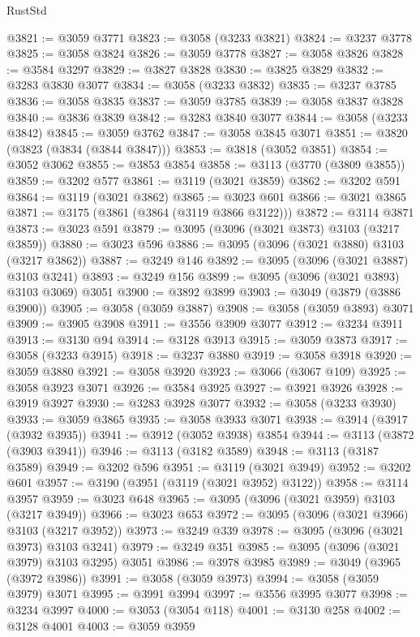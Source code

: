 \begin{lexlean}{RustStd}
\begin{coremodule}
{\begin{coremodule}
{{{{{{{{{{{{{{{{{{{{{{{{{{{{{{{{@3821 := @3059 @3771
@3823 := @3058 (@3233 @3821)
@3824 := @3237 @3778
@3825 := @3058 @3824
@3826 := @3059 @3778
@3827 := @3058 @3826
@3828 := @3584 @3297
@3829 := @3827 @3828
@3830 := @3825 @3829
@3832 := @3283 @3830 @3077
@3834 := @3058 (@3233 @3832)
@3835 := @3237 @3785
@3836 := @3058 @3835
@3837 := @3059 @3785
@3839 := @3058 @3837 @3828
@3840 := @3836 @3839
@3842 := @3283 @3840 @3077
@3844 := @3058 (@3233 @3842)
@3845 := @3059 @3762
@3847 := @3058 @3845 @3071
@3851 := @3820 (@3823 (@3834 (@3844 @3847)))
@3853 := @3818 (@3052 @3851)
@3854 := @3052 @3062
@3855 := @3853 @3854
@3858 := @3113 (@3770 (@3809 @3855))
@3859 := @3202 @577
@3861 := @3119 (@3021 @3859)
@3862 := @3202 @591
@3864 := @3119 (@3021 @3862)
@3865 := @3023 @601
@3866 := @3021 @3865
@3871 := @3175 (@3861 (@3864 (@3119 @3866 @3122)))
@3872 := @3114 @3871
@3873 := @3023 @591
@3879 := @3095 (@3096 (@3021 @3873) @3103 (@3217 @3859))
@3880 := @3023 @596
@3886 := @3095 (@3096 (@3021 @3880) @3103 (@3217 @3862))
@3887 := @3249 @146
@3892 := @3095 (@3096 (@3021 @3887) @3103 @3241)
@3893 := @3249 @156
@3899 := @3095 (@3096 (@3021 @3893) @3103 @3069) @3051
@3900 := @3892 @3899
@3903 := @3049 (@3879 (@3886 @3900))
@3905 := @3058 (@3059 @3887)
@3908 := @3058 (@3059 @3893) @3071
@3909 := @3905 @3908
@3911 := @3556 @3909 @3077
@3912 := @3234 @3911
@3913 := @3130 @94
@3914 := @3128 @3913
@3915 := @3059 @3873
@3917 := @3058 (@3233 @3915)
@3918 := @3237 @3880
@3919 := @3058 @3918
@3920 := @3059 @3880
@3921 := @3058 @3920
@3923 := @3066 (@3067 @109)
@3925 := @3058 @3923 @3071
@3926 := @3584 @3925
@3927 := @3921 @3926
@3928 := @3919 @3927
@3930 := @3283 @3928 @3077
@3932 := @3058 (@3233 @3930)
@3933 := @3059 @3865
@3935 := @3058 @3933 @3071
@3938 := @3914 (@3917 (@3932 @3935))
@3941 := @3912 (@3052 @3938) @3854
@3944 := @3113 (@3872 (@3903 @3941))
@3946 := @3113 (@3182 @3589)
@3948 := @3113 (@3187 @3589)
@3949 := @3202 @596
@3951 := @3119 (@3021 @3949)
@3952 := @3202 @601
@3957 := @3190 (@3951 (@3119 (@3021 @3952) @3122))
@3958 := @3114 @3957
@3959 := @3023 @648
@3965 := @3095 (@3096 (@3021 @3959) @3103 (@3217 @3949))
@3966 := @3023 @653
@3972 := @3095 (@3096 (@3021 @3966) @3103 (@3217 @3952))
@3973 := @3249 @339
@3978 := @3095 (@3096 (@3021 @3973) @3103 @3241)
@3979 := @3249 @351
@3985 := @3095 (@3096 (@3021 @3979) @3103 @3295) @3051
@3986 := @3978 @3985
@3989 := @3049 (@3965 (@3972 @3986))
@3991 := @3058 (@3059 @3973)
@3994 := @3058 (@3059 @3979) @3071
@3995 := @3991 @3994
@3997 := @3556 @3995 @3077
@3998 := @3234 @3997
@4000 := @3053 (@3054 @118)
@4001 := @3130 @258
@4002 := @3128 @4001
@4003 := @3059 @3959
}}}}}}}}}}}}}}}}}}}}}}}}}}}}}}}}
\end{coremodule}}
\end{coremodule}
\end{lexlean}
